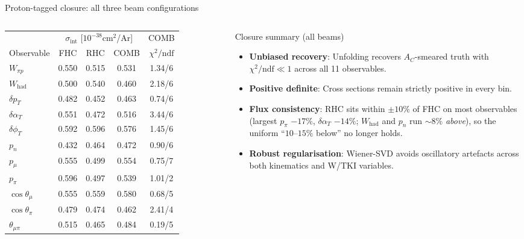 \documentclass[aspectratio=169,10pt]{beamer}
\begin{document}
\begin{frame}{Proton-tagged closure: all three beam configurations}
  \begin{columns}[T]
  \centering\tiny
  \begin{tabular}{lccc|c}
  \toprule
  & \multicolumn{3}{c|}{$\sigma_\mathrm{int}$ [$10^{-38}$cm$^2$/Ar]} & COMB\\
  Observable & FHC & RHC & COMB & $\chi^2/\mathrm{ndf}$\\\midrule
  $W_{\pi p}$        & 0.550 & 0.515 & 0.531 & 1.34/6\\
  $W_\mathrm{had}$   & 0.500 & 0.540 & 0.460 & 2.18/6\\
  $\delta p_T$       & 0.482 & 0.452 & 0.463 & 0.74/6\\
  $\delta\alpha_T$   & 0.551 & 0.472 & 0.516 & 3.44/6\\
  $\delta\phi_T$     & 0.592 & 0.596 & 0.576 & 1.45/6\\
  $p_n$              & 0.432 & 0.464 & 0.472 & 0.90/6\\
  \midrule
  $p_\mu$            & 0.555 & 0.499 & 0.554 & 0.75/7\\
  $p_\pi$            & 0.596 & 0.497 & 0.539 & 1.01/2\\
  $\cos\theta_\mu$   & 0.555 & 0.559 & 0.580 & 0.68/5\\
  $\cos\theta_\pi$   & 0.479 & 0.474 & 0.462 & 2.41/4\\
  $\theta_{\mu\pi}$  & 0.515 & 0.465 & 0.484 & 0.19/5\\
  \bottomrule
  \end{tabular}
  \begin{block}{Closure summary (all beams)}\footnotesize
  \begin{itemize}\setlength\itemsep{3pt}
    \item \textbf{Unbiased recovery}: Unfolding recovers $A_C$-smeared truth with $\chi^2/\mathrm{ndf} \ll 1$ across all 11 observables.
    \item \textbf{Positive definite}: Cross sections remain strictly positive in every bin.
    \item \textbf{Flux consistency}: RHC sits within $\pm10\%$ of FHC on most observables (largest $p_\pi$ $-17\%$, $\delta\alpha_T$ $-14\%$; $W_\mathrm{had}$ and $p_n$ run ${\sim}8\%$ \emph{above}), so the uniform ``$10\text{--}15\%$ below'' no longer holds.
    \item \textbf{Robust regularisation}: Wiener-SVD avoids oscillatory artefacts across both kinematics and W/TKI variables.
  \end{itemize}
  \end{block}
  \end{columns}
\end{frame}
\end{document}
